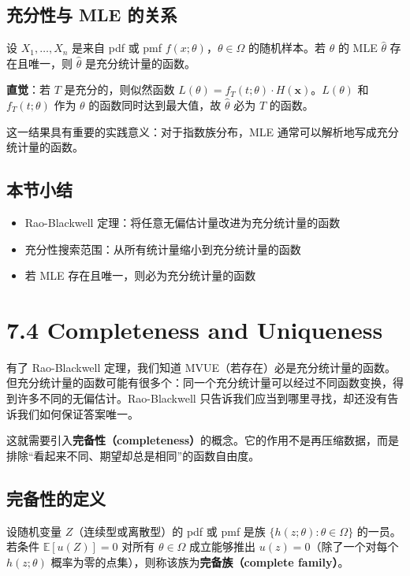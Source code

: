 \subsection{充分性与 MLE 的关系}

\begin{theorem}\label{th:sufficient-mle}
设 $X_1, \ldots, X_n$ 是来自 pdf 或 pmf $f(x; \theta)$，$\theta \in \Omega$ 的随机样本。若 $\theta$ 的 MLE $\hat{\theta}$ 存在且唯一，则 $\hat{\theta}$ 是充分统计量的函数。
\end{theorem}

\textbf{直觉}：若 $T$ 是充分的，则似然函数 $L(\theta) = f_{T}(t; \theta) \cdot H(\mathbf{x})$。$L(\theta)$ 和 $f_{T}(t; \theta)$ 作为 $\theta$ 的函数同时达到最大值，故 $\hat{\theta}$ 必为 $T$ 的函数。

这一结果具有重要的实践意义：对于指数族分布，MLE 通常可以解析地写成充分统计量的函数。

\subsection*{本节小结}

\begin{itemize}
\item Rao-Blackwell 定理：将任意无偏估计量改进为充分统计量的函数
\item 充分性搜索范围：从所有统计量缩小到充分统计量的函数
\item 若 MLE 存在且唯一，则必为充分统计量的函数
\end{itemize}

\section{7.4 Completeness and Uniqueness}\label{sec:7.4}

有了 Rao-Blackwell 定理，我们知道 MVUE（若存在）必是充分统计量的函数。但充分统计量的函数可能有很多个：同一个充分统计量可以经过不同函数变换，得到许多不同的无偏估计。Rao-Blackwell 只告诉我们应当到哪里寻找，却还没有告诉我们如何保证答案唯一。

这就需要引入\textbf{完备性（completeness）}的概念。它的作用不是再压缩数据，而是排除``看起来不同、期望却总是相同''的函数自由度。

\subsection{完备性的定义}

\begin{definition}[完备族]\label{def:complete-family}
设随机变量 $Z$（连续型或离散型）的 pdf 或 pmf 是族 $\{h(z; \theta): \theta \in \Omega\}$ 的一员。若条件 $\mathbb{E}[u(Z)] = 0$ 对所有 $\theta \in \Omega$ 成立能够推出 $u(z) = 0$（除了一个对每个 $h(z; \theta)$ 概率为零的点集），则称该族为\textbf{完备族（complete family）}。
\end{definition}

